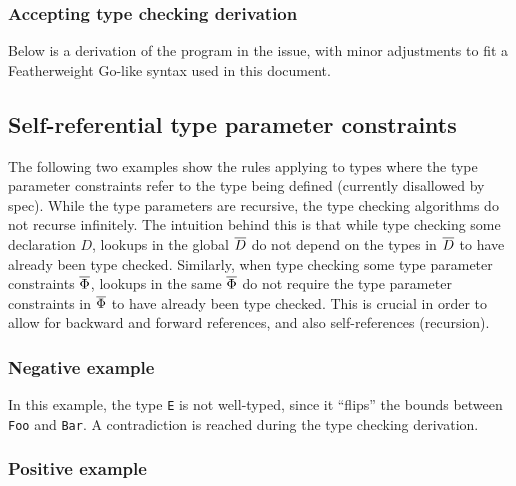 \documentclass[12pt]{article}
\begin{document}
\subsubsection{Accepting type checking derivation}


\noindent
Below is a derivation of the program in the issue, with minor adjustments to
fit a Featherweight Go-like syntax used in this document.



\subsection{Self-referential type parameter constraints}

The following two examples show the rules applying to types where the type
parameter constraints refer to the type being defined (currently disallowed by
spec). While the type parameters are recursive, the type checking algorithms do
not recurse infinitely. The intuition behind this is that while type checking
some declaration $D$, lookups in the global $\overline{D}$ do not depend on the types
in $\overline{D}$ to have already been type checked. Similarly, when type checking
some type parameter constraints $\overline{\Phi}$, lookups in the same $\overline{\Phi}$ do
not require the type parameter constraints in $\overline{\Phi}$ to have already been
type checked. This is crucial in order to allow for backward and forward
references, and also self-references (recursion).

\subsubsection{Negative example}

In this example, the type \texttt{E} is not well-typed, since it ``flips'' the
bounds between \texttt{Foo} and \texttt{Bar}. A contradiction is reached during
the type checking derivation.





\subsubsection{Positive example}
\end{document}
